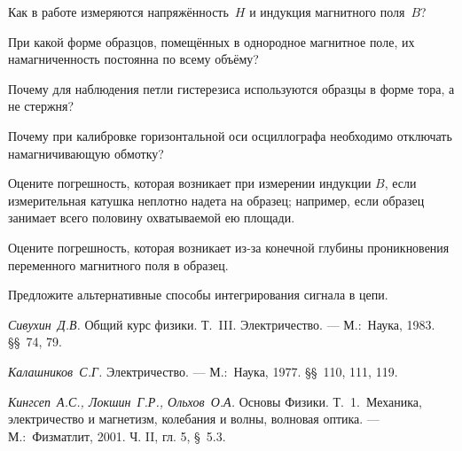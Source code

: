\begin{lab:questions}

\item Как в работе измеряются напряжённость~$H$ и индукция магнитного поля~$B$?

\item
При какой форме образцов, помещённых в однородное магнитное поле, их
намагниченность постоянна по всему объёму?

\item
Почему для наблюдения петли гистерезиса используются образцы в форме тора,
а не стержня?

\item
Почему при калибровке горизонтальной оси осциллографа необходимо от­ключать
намагничивающую обмотку?

\item
Оцените погрешность, которая возникает при измерении индукции $B$, если
измерительная катушка неплотно надета на образец; например, если образец
занимает всего половину охватываемой ею площади.

\item
Оцените погрешность, которая возникает из-за конечной глубины проникновения
переменного магнитного поля в образец.

\item Предложите альтернативные способы интегрирования сигнала в цепи.

\end{lab:questions}
\begin{lab:literature}
\item
\textit{Сивухин~Д.В.} Общий курс физики. Т.~III. Электричество. --- М.:~Наука,
1983. \S\S~74, 79.

\item
\textit{Калашников~С.Г.} Электричество. --- М.:~Наука, 1977. \S\S~110, 111, 119.

\item
\textit{Кингсеп~А.С., Локшин~Г.Р., Ольхов~О.А.} Основы Физики. Т.~1.~Механика,
электричество и магнетизм, колебания и волны, волновая оптика. ---
М.:~Физматлит, 2001. Ч. II, гл. 5, \S~5.3.
\end{lab:literature}
